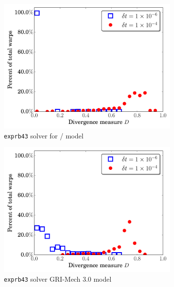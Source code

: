 \documentclass[preprint,review,11pt]{elsarticle}
\begin{document}
\begin{figure}[htbp]
\begin{subfigure}{0.49\textwidth}
      \includegraphics[width=\linewidth]{H2_exprb43_div.pdf}
      \caption{\texttt{exprb43} solver for \slash{} model}
      \label{F:exprb43_div_h2}
  \end{subfigure}
  \begin{subfigure}{0.49\textwidth}
      \includegraphics[width=\linewidth]{CH4_exprb43_div.pdf}
      \caption{\texttt{exprb43} solver GRI-Mech 3.0 model}
      \label{F:exprb43_div_ch4}
  \end{subfigure}
  \\
  \begin{subfigure}{0.49\textwidth}

\end{subfigure}
\end{figure}
\end{document}
